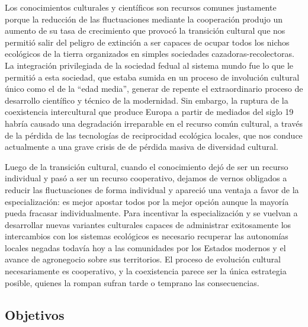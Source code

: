\documentclass[a4paper,10pt]{book}
\theoremstyle{definition}
\begin{document}

Los conocimientos culturales y científicos son recursos comunes justamente porque la reducción de las fluctuaciones mediante la cooperación produjo un aumento de su tasa de crecimiento que provocó la transición cultural que nos permitió salir del peligro de extinción a ser capaces de ocupar todos los nichos ecológicos de la tierra organizados en simples sociedades cazadoras-recolectoras.
%
La integración privilegiada de la sociedad fedual al sistema mundo fue lo que le permitió a esta sociedad, que estaba sumida en un proceso de involuci\'on cultural \'unico como el de la ``edad media'', generar de repente el extraordinario proceso de desarrollo cient\'ifico y t\'ecnico de la modernidad.
%
Sin embargo, la ruptura de la coexistencia intercultural que produce Europa a partir de mediados del siglo 19 habría causado una degradación irreparable en el recurso común cultural, a través de la pérdida de las tecnologías de reciprocidad ecológica locales, que nos conduce actualmente a una grave crisis de de pérdida masiva de diversidad cultural.


Luego de la transición cultural, cuando el conocimiento dejó de ser un recurso individual y pasó a ser un recurso cooperativo, dejamos de vernos obligados a reducir las fluctuaciones de forma individual y apareció una ventaja a favor de la especialización: es mejor apostar todos por la mejor opción aunque la mayoría pueda fracasar individualmente.
%
Para incentivar la especialización y se vuelvan a desarrollar nuevas variantes culturales capaces de administrar exitosamente los intercambios con los sistemas ecológicos es necesario recuperar las autonomías locales negadas todavía hoy a las comunidades por los Estados modernos y el avance de agronegocio sobre sus territorios.
%
El proceso de evolución cultural necesariamente es cooperativo, y la coexistencia parece ser la \'unica estrategia posible, quienes la rompan sufran tarde o temprano las consecuencias.


\subsection{Objetivos} 
\end{document}
